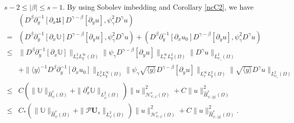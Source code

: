 \documentclass{amsart}
\numberwithin{equation}{section}
\newcommand\y{{{\langle y \rangle}}}
\begin{document}
 $s-2\leq|\beta|\leq s-1$. By using Sobolev imbedding and Corollary \ref{ncC2}, we have
\begin{align*}
&(D^{\beta}\partial_{y}^{-1}[\partial_{x}\mathfrak{U}]D^{\gamma-\beta}[\partial_{y}u],\psi_{\gamma}^{2}D^{\gamma}u)\\
=& (D^{\beta}\partial_{y}^{-1}[\partial_{x}\mathbb{U}]D^{\gamma-\beta}[\partial_{y}u],\psi_{\gamma}^{2}D^{\gamma}u)
  +(D^{\beta}\partial_{y}^{-1}[\partial_{x}u_{0}]D^{\gamma-\beta}[\partial_{y}u],\psi_{\gamma}^{2}D^{\gamma}u)\\
\leq& \|D^{\beta}\partial_{y}^{-1}[\partial_{x}\mathbb{U}]\|_{L_{x}^{2}L_{y}^{\infty}(\Omega)}
      \|\psi_{\gamma}D^{\gamma-\beta}[\partial_{y}u]\|_{L_{x}^{\infty}L_{y}^{2}(\Omega)}
      \|D^{\gamma}u\|_{L_{\psi_{\gamma}}^{2}(\Omega)}\\
    &+\|\y^{-1}D^{\beta}\partial_{y}^{-1}[\partial_{x}u_{0}]\|_{L_{x}^{2}L_{y}^{\infty}(\Omega)}
      \|\psi_{\gamma}\sqrt{\y}D^{\gamma-\beta}[\partial_{y}u]\|_{L_{x}^{\infty}L_{y}^{2}(\Omega)}
      \|\sqrt{\y}D^{\gamma}u\|_{L_{\psi_{\gamma}}^{2}(\Omega)}\\
\leq& C\left(\|\mathbb{U}\|_{\hat{H}_{\psi}^{s}(\Omega)}
        +\|\partial_{x}^{s}\mathbb{U}\|_{L_{\hat{\psi}}^{2}(\Omega)}\right)
       \|u\|_{\mathcal{H}_{\psi,\varphi}^{s}(\Omega)}^{2}
     +C\|u\|_{\hat{H}_{\psi,\y}^{s}(\Omega)}^{2}\\
\leq& C_{*}\left(\|\mathbb{U}\|_{\hat{H}_{\psi}^{s}(\Omega)}+\|\mathcal{P}\mathbf{U}_{s}\|_{L_{\varphi}^{2}(\Omega)}\right)
       \|u\|_{\mathcal{H}_{\psi,\varphi}^{s}(\Omega)}^{2}
     +C\|u\|_{\hat{H}_{\psi,\y}^{s}(\Omega)}^{2}.
\end{align*}
\end{document}
